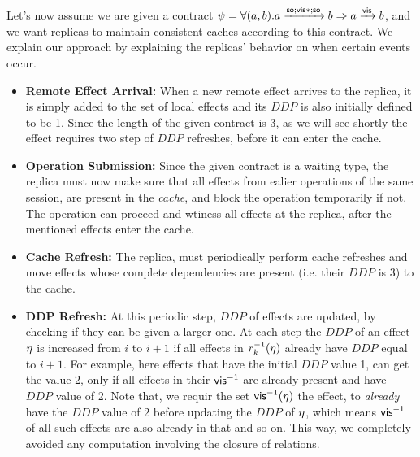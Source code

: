 Let's now assume we are given a contract $\psi=\forall (a,b). a
\xrightarrow{{\normalfont \textsf{so}};{\normalfont \textsf{vis}}*;{\normalfont \textsf{so}}}b \Rightarrow a \xrightarrow{{\normalfont \textsf{vis}}} b$, and
we want replicas to maintain consistent caches according to this
contract. We explain our approach by
explaining the replicas' behavior on when certain events occur. 
\begin{itemize}
\item {\bf Remote Effect Arrival:} When a new remote effect arrives to the
replica, it is simply added to the set of local effects and 
its $DDP$ is also initially defined to be 1. Since the length of the
given contract is 3, as we will see shortly the effect requires two step
of $DDP$ refreshes, before it can enter the cache.
\item {\bf Operation Submission: } Since the given contract is a waiting
type, the replica must now make sure that all effects from ealier
operations of the same session, are present in the \emph{cache}, and
block the operation temporarily if not. The operation can proceed and
wtiness all effects at the replica, after the mentioned effects enter
the cache.
\item {\bf Cache Refresh: } The replica, must periodically perform 
cache refreshes and move effects whose complete dependencies are present (i.e.
their $DDP$ is 3) to the cache. 
\item {\bf DDP Refresh: } At this periodic step, $DDP$ of effects are
updated, by checking if they can be given a larger one. 
At each step the $DDP$ of an effect $\eta$ is increased from $i$ to $i+1$ if
all effects in $r_k^{-1}(\eta)$ already have $DDP$ equal to $i+1$.
For example, here effects that have the initial $DDP$ value 1, can get
the value 2, only if all effects in their  ${\normalfont \textsf{vis}}^{-1}$ are already
present  and have $DDP$ value of 2. 
Note that, we requir the set ${\normalfont \textsf{vis}}^{-1}(\eta)$ 
the effect, to \emph{already} have the $DDP$ value of 2 before updating
the $DDP$ of $\eta$, which means
${\normalfont \textsf{vis}}^{-1}$ of all such effects are also already in that and so on.
This way, we completely avoided any computation involving the closure of
relations. 
\end{itemize}




